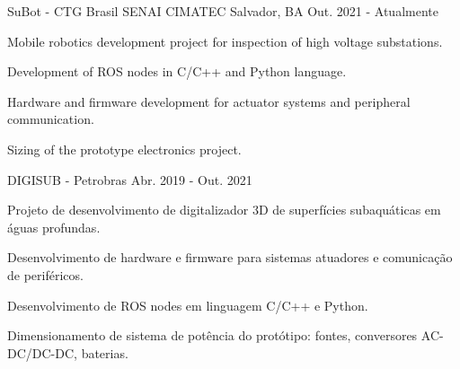

\begin{cventries}

  \cventry
    {SuBot - CTG Brasil} %
    {SENAI CIMATEC} %
    {Salvador, BA} %
    {Out. 2021 - Atualmente} %
    {
      \begin{cvitems} %
        \item {Mobile robotics development project for inspection of high voltage substations.}
        \item {Development of ROS nodes in C/C++ and Python language.}
        \item {Hardware and firmware development for actuator systems and peripheral communication.}
        \item {Sizing of the prototype electronics project.}
      \end{cvitems}
    }


  \cventry
    {DIGISUB - Petrobras} %
    {} %
    {} %
    {Abr. 2019 - Out. 2021} %
    {
      \begin{cvitems} %
        \item {Projeto de desenvolvimento de digitalizador 3D de superfícies subaquáticas em águas profundas.}
        \item {Desenvolvimento de hardware e firmware para sistemas atuadores e comunicação de periféricos.}
        \item {Desenvolvimento de ROS nodes em linguagem C/C++ e Python.}
        \item {Dimensionamento de sistema de potência do protótipo: fontes, conversores AC-DC/DC-DC, baterias.}
      \end{cvitems}
    }



\end{cventries}
